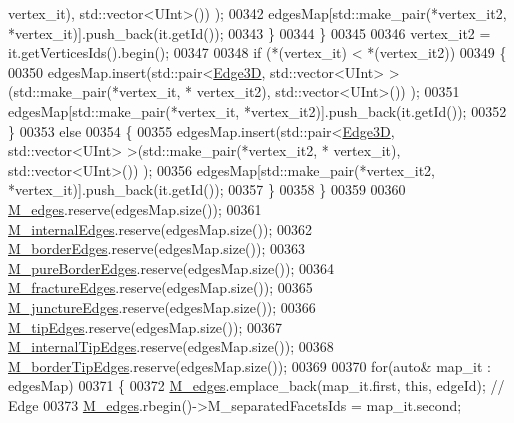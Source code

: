 \begin{DoxyCode}
      vertex\_it), std::vector<UInt>()) );
00342                 edgesMap[std::make\_pair(*vertex\_it2, *vertex\_it)].push\_back(it.getId());
00343             \}
00344         \}
00345 
00346         vertex\_it2 = it.getVerticesIds().begin();
00347 
00348         \textcolor{keywordflow}{if} (*(vertex\_it) < *(vertex\_it2))
00349         \{
00350             edgesMap.insert(std::pair<\hyperlink{classFVCode3D_1_1Rigid__Mesh_a396039ac2943822c4652967ce1849c9f}{Edge3D}, std::vector<UInt> >(std::make\_pair(*vertex\_it, *
      vertex\_it2), std::vector<UInt>()) );
00351             edgesMap[std::make\_pair(*vertex\_it, *vertex\_it2)].push\_back(it.getId());
00352         \}
00353         \textcolor{keywordflow}{else}
00354         \{
00355             edgesMap.insert(std::pair<\hyperlink{classFVCode3D_1_1Rigid__Mesh_a396039ac2943822c4652967ce1849c9f}{Edge3D}, std::vector<UInt> >(std::make\_pair(*vertex\_it2, *
      vertex\_it), std::vector<UInt>()) );
00356             edgesMap[std::make\_pair(*vertex\_it2, *vertex\_it)].push\_back(it.getId());
00357         \}
00358     \}
00359 
00360     \hyperlink{classFVCode3D_1_1Rigid__Mesh_a4c6287c9256a92c13486048c372fe487}{M\_edges}.reserve(edgesMap.size());
00361     \hyperlink{classFVCode3D_1_1Rigid__Mesh_a3b689233b2590d76d663195b89d380fb}{M\_internalEdges}.reserve(edgesMap.size());
00362     \hyperlink{classFVCode3D_1_1Rigid__Mesh_af9ba7882baec8f8e5e7693a38f3cbc9b}{M\_borderEdges}.reserve(edgesMap.size());
00363     \hyperlink{classFVCode3D_1_1Rigid__Mesh_a72e5bc2acebdc3bca417fa55dfd4c8c0}{M\_pureBorderEdges}.reserve(edgesMap.size());
00364     \hyperlink{classFVCode3D_1_1Rigid__Mesh_af4626d6b92116a3f6e925847f413da2b}{M\_fractureEdges}.reserve(edgesMap.size());
00365     \hyperlink{classFVCode3D_1_1Rigid__Mesh_a01850de43f4d5d1dcf617d7697bcf3e8}{M\_junctureEdges}.reserve(edgesMap.size());
00366     \hyperlink{classFVCode3D_1_1Rigid__Mesh_a973940e6cd68e9980afec97fe94a70f4}{M\_tipEdges}.reserve(edgesMap.size());
00367     \hyperlink{classFVCode3D_1_1Rigid__Mesh_a15cb042bfb5d94c4ce34f20d1e92ebb5}{M\_internalTipEdges}.reserve(edgesMap.size());
00368     \hyperlink{classFVCode3D_1_1Rigid__Mesh_a712ea50f5237025e92af21799c5ec31b}{M\_borderTipEdges}.reserve(edgesMap.size());
00369 
00370     \textcolor{keywordflow}{for}(\textcolor{keyword}{auto}& map\_it : edgesMap)
00371     \{
00372         \hyperlink{classFVCode3D_1_1Rigid__Mesh_a4c6287c9256a92c13486048c372fe487}{M\_edges}.emplace\_back(map\_it.first, \textcolor{keyword}{this}, edgeId); \textcolor{comment}{// Edge}
00373         \hyperlink{classFVCode3D_1_1Rigid__Mesh_a4c6287c9256a92c13486048c372fe487}{M\_edges}.rbegin()->M\_separatedFacetsIds = map\_it.second;

\end{DoxyCode}
